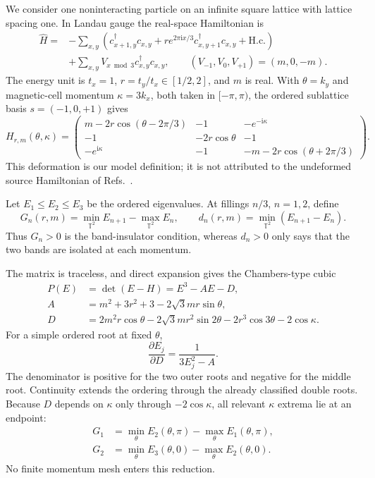 \documentclass[aps,prb,preprint,superscriptaddress,nofootinbib]{revtex4-2}
\newcommand{\T}{\mathbb T}
\newcommand{\ii}{\mathrm i}
\begin{document}
We consider one noninteracting particle on an infinite square lattice with
lattice spacing one.  In Landau gauge the real-space Hamiltonian is
\begin{align}
\widehat H={}&-\sum_{x,y}\left(c^\dagger_{x+1,y}c_{x,y}
+r e^{2\pi\ii x/3}c^\dagger_{x,y+1}c_{x,y}+\mathrm{H.c.}\right)
\nonumber\\
&+\sum_{x,y}V_{x\bmod3}c^\dagger_{x,y}c_{x,y},
\qquad (V_{-1},V_0,V_{+1})=(m,0,-m).
\label{eq:realspace}
\end{align}
The energy unit is $t_x=1$, $r=t_y/t_x\in[1/2,2]$, and $m$ is real.  With
$\theta=k_y$ and magnetic-cell momentum $\kappa=3k_x$, both taken in
$[-\pi,\pi)$, the ordered sublattice basis $s=(-1,0,+1)$ gives
\begin{equation}
H_{r,m}(\theta,\kappa)=
\begin{pmatrix}
m-2r\cos(\theta-2\pi/3)&-1&-e^{-\ii\kappa}\\
-1&-2r\cos\theta&-1\\
-e^{\ii\kappa}&-1&-m-2r\cos(\theta+2\pi/3)
\end{pmatrix}.
\label{eq:bloch}
\end{equation}
This deformation is our model definition; it is not attributed to the
undeformed source Hamiltonian of Refs.~\cite{Hofstadter1976,Cooper2019}.

Let $E_1\leq E_2\leq E_3$ be the ordered eigenvalues.  At fillings $n/3$,
$n=1,2$, define
\begin{equation}
G_n(r,m)=\min_{\T^2}E_{n+1}-\max_{\T^2}E_n,
\qquad
d_n(r,m)=\min_{\T^2}(E_{n+1}-E_n).
\label{eq:gaps}
\end{equation}
Thus $G_n>0$ is the band-insulator condition, whereas $d_n>0$ only says that
the two bands are isolated at each momentum.

The matrix is traceless, and direct expansion gives the Chambers-type cubic
\begin{align}
P(E)&=\det(E-H)=E^3-AE-D,\label{eq:cubic}\\
A&=m^2+3r^2+3-2\sqrt3mr\sin\theta,\nonumber\\
D&=2m^2r\cos\theta-2\sqrt3mr^2\sin2\theta
-2r^3\cos3\theta-2\cos\kappa.\nonumber
\end{align}
For a simple ordered root at fixed $\theta$,
\begin{equation}
\frac{\partial E_j}{\partial D}=\frac{1}{3E_j^2-A}.
\label{eq:rootderivative}
\end{equation}
The denominator is positive for the two outer roots and negative for the
middle root.  Continuity extends the ordering through the already classified
double roots.  Because $D$ depends on $\kappa$ only through
$-2\cos\kappa$, all relevant $\kappa$ extrema lie at an endpoint:
\begin{align}
G_1&=\min_\theta E_2(\theta,\pi)-\max_\theta E_1(\theta,\pi),\nonumber\\
G_2&=\min_\theta E_3(\theta,0)-\max_\theta E_2(\theta,0).
\label{eq:kappareduction}
\end{align}
No finite momentum mesh enters this reduction.
\end{document}
